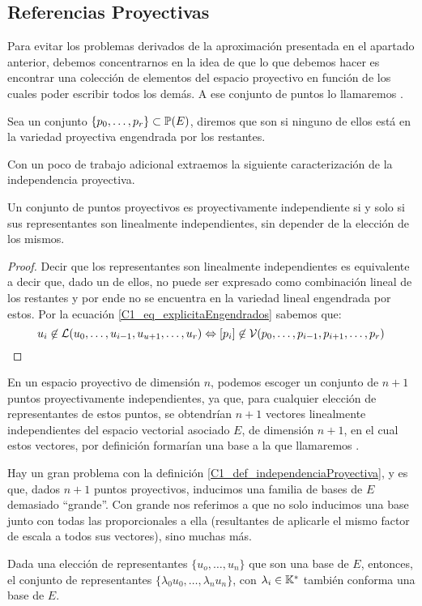\subsection{Referencias Proyectivas}
Para evitar los problemas derivados de la aproximación presentada en el apartado anterior, debemos concentrarnos en la idea de que lo que debemos hacer es encontrar una colección de elementos del espacio proyectivo en función de los cuales poder escribir todos los demás. A ese conjunto de puntos lo llamaremos .
\begin{defi}
	\label{C1_def_independenciaProyectiva}
	Sea un conjunto $\{p_0,\dots,p_r\}\subset\mathbb{P}(E)$, diremos que son  si ninguno de ellos está en la variedad proyectiva engendrada por los restantes.
\end{defi}
Con un poco de trabajo adicional extraemos la siguiente caracterización de la independencia proyectiva.
\begin{lem}
	\label{C1_lem_caracterizacionIndependencia}
	Un conjunto de puntos proyectivos es proyectivamente independiente si y solo si sus representantes son linealmente independientes, sin depender de la elección de los mismos. 
\end{lem}
\begin{proof}
	Decir que los representantes son linealmente independientes es equivalente a decir que, dado un de ellos, no puede ser expresado como combinación lineal de los restantes y por ende no se encuentra en la variedad lineal engendrada por estos. Por la ecuación \ref{C1_eq_explicitaEngendrados} sabemos que:
	\[u_i\not\in\mathcal{L}(u_0,\dots,u_{i-1},u_{u+1},\dots,u_{r})\Leftrightarrow\left [ p_i \right ]\not\in\mathcal{V}(p_0,\dots,p_{i-1},p_{i+1},\dots,p_r)\]
\end{proof}
\begin{obs}
	\label{C1_obs_baseInducida}
	En un espacio proyectivo de dimensión $n$, podemos escoger un conjunto de $n+1$ puntos proyectivamente independientes, ya que, para cualquier elección de representantes de estos puntos, se obtendrían $n+1$ vectores linealmente independientes del espacio vectorial asociado $E$, de dimensión $n+1$, en el cual estos vectores, por definición formarían una base a la que llamaremos .
\end{obs}
Hay un gran problema con la definición \ref{C1_def_independenciaProyectiva}, y es que, dados $n+1$ puntos proyectivos, inducimos una familia de bases de $E$ demasiado ``grande''. Con grande nos referimos a que no solo inducimos una base junto con todas las proporcionales a ella (resultantes de aplicarle el mismo factor de escala a todos sus vectores), sino muchas más.
\begin{obs}
	\label{C1_obs_noUnicidadBase}
	Dada una elección de representantes $\{u_o,\dots,u_n\}$ que son una base de $E$, entonces, el conjunto de representantes $\{\lambda_0u_0,\dots,\lambda_nu_n\}$, con $\lambda_i\in\mathbb{K}^*$ también conforma una base de $E$.
\end{obs}

